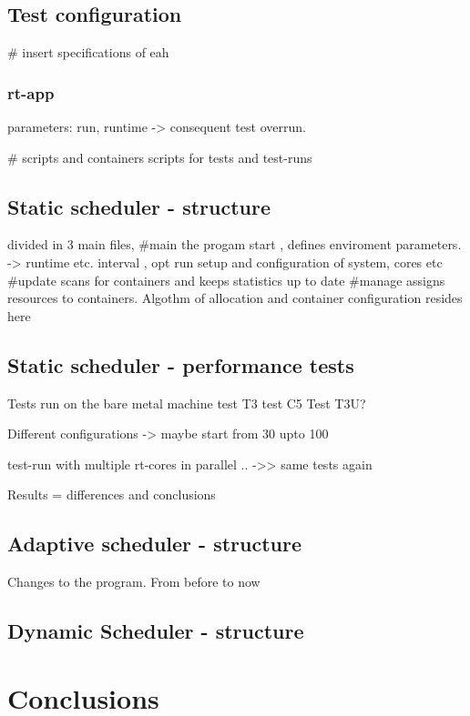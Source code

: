 \documentclass[]{scrartcl}
\begin{document}

\subsection{Test configuration}


# insert specifications of eah 

\subsubsection{rt-app}

parameters: run, runtime -> consequent test overrun.

#
scripts and containers
scripts for tests and test-runs

\subsection{Static scheduler - structure}

divided in 3 main files, 
#main 
the progam start , defines enviroment parameters. -> runtime etc. interval , opt run
setup and configuration of system, cores etc
#update 
scans for containers and keeps statistics up to date
#manage
assigns resources to containers. Algothm of allocation and container configuration resides here

\subsection{Static scheduler - performance tests}

Tests run on the bare metal machine
test T3
test C5
Test T3U?

Different configurations
-> maybe start from 30%
upto 100%

test-run with multiple rt-cores in parallel .. ->> same tests again

Results = differences and conclusions

\subsection{Adaptive scheduler -  structure}

Changes to the program. From before to now


\subsection{Dynamic Scheduler - structure}


\section{Conclusions}
\label{sec:conclusions}



\end{document}
